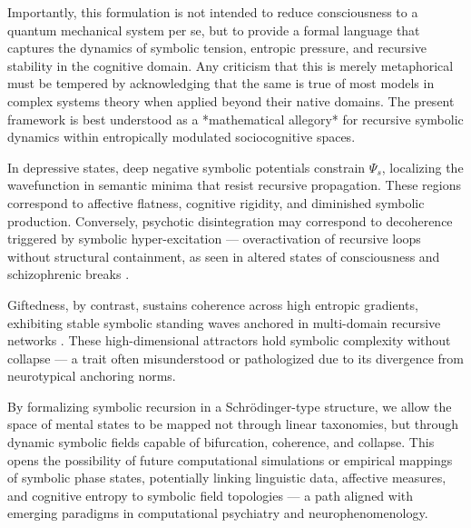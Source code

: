 Importantly, this formulation is not intended to reduce consciousness to a quantum mechanical system per se, but to provide a formal language that captures the dynamics of symbolic tension, entropic pressure, and recursive stability in the cognitive domain. Any criticism that this is merely metaphorical must be tempered by acknowledging that the same is true of most models in complex systems theory when applied beyond their native domains. The present framework is best understood as a *mathematical allegory* for recursive symbolic dynamics within entropically modulated sociocognitive spaces.

In depressive states, deep negative symbolic potentials constrain \( \Psi_s \), localizing the wavefunction in semantic minima that resist recursive propagation. These regions correspond to affective flatness, cognitive rigidity, and diminished symbolic production. Conversely, psychotic disintegration may correspond to decoherence triggered by symbolic hyper-excitation — overactivation of recursive loops without structural containment, as seen in altered states of consciousness and schizophrenic breaks \cite{carhart2014, tagliazucchi2016}.

Giftedness, by contrast, sustains coherence across high entropic gradients, exhibiting stable symbolic standing waves anchored in multi-domain recursive networks \cite{silverman2009, rinn2012}. These high-dimensional attractors hold symbolic complexity without collapse — a trait often misunderstood or pathologized due to its divergence from neurotypical anchoring norms.

By formalizing symbolic recursion in a Schrödinger-type structure, we allow the space of mental states to be mapped not through linear taxonomies, but through dynamic symbolic fields capable of bifurcation, coherence, and collapse. This opens the possibility of future computational simulations or empirical mappings of symbolic phase states, potentially linking linguistic data, affective measures, and cognitive entropy to symbolic field topologies — a path aligned with emerging paradigms in computational psychiatry and neurophenomenology.